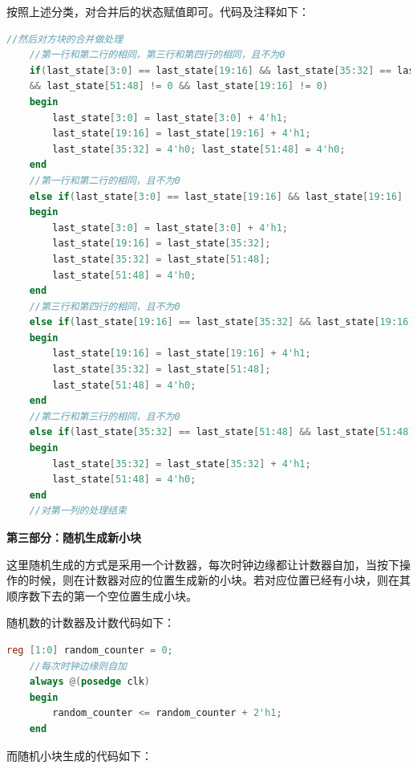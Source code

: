 \documentclass[UTF8]{article}
\newcommand{\jumpline} {\hspace*{\fill} \par}
\begin{document}
	按照上述分类，对合并后的状态赋值即可。代码及注释如下：\par
	\begin{lstlisting}[language=Verilog, name=方块合并]
	//然后对方块的合并做处理
	//第一行和第二行的相同，第三行和第四行的相同，且不为0
	if(last_state[3:0] == last_state[19:16] && last_state[35:32] == last_state[51:48]
	&& last_state[51:48] != 0 && last_state[19:16] != 0)
	begin
		last_state[3:0] = last_state[3:0] + 4'h1;
		last_state[19:16] = last_state[19:16] + 4'h1;
		last_state[35:32] = 4'h0; last_state[51:48] = 4'h0;
	end
	//第一行和第二行的相同，且不为0
	else if(last_state[3:0] == last_state[19:16] && last_state[19:16] != 0)
	begin
		last_state[3:0] = last_state[3:0] + 4'h1;
		last_state[19:16] = last_state[35:32];
		last_state[35:32] = last_state[51:48]; 
		last_state[51:48] = 4'h0;
	end
	//第三行和第四行的相同，且不为0
	else if(last_state[19:16] == last_state[35:32] && last_state[19:16] != 0)
	begin
		last_state[19:16] = last_state[19:16] + 4'h1;
		last_state[35:32] = last_state[51:48];
		last_state[51:48] = 4'h0;
	end
	//第二行和第三行的相同，且不为0
	else if(last_state[35:32] == last_state[51:48] && last_state[51:48] != 0)
	begin
		last_state[35:32] = last_state[35:32] + 4'h1; 
		last_state[51:48] = 4'h0;
	end
	//对第一列的处理结束
	\end{lstlisting}\par
	\jumpline
	\textbf{第三部分：随机生成新小块}\par
	这里随机生成的方式是采用一个计数器，每次时钟边缘都让计数器自加，当按下操作的时候，则在计数器对应的位置生成新的小块。若对应位置已经有小块，则在其顺序数下去的第一个空位置生成小块。\par
	随机数的计数器及计数代码如下：\par
	\begin{lstlisting}[language=Verilog, name=随机数的计数器]
	reg [1:0] random_counter = 0;
	//每次时钟边缘则自加
	always @(posedge clk)
	begin
		random_counter <= random_counter + 2'h1;
	end
	\end{lstlisting}\par
	而随机小块生成的代码如下：\par
\end{document}
